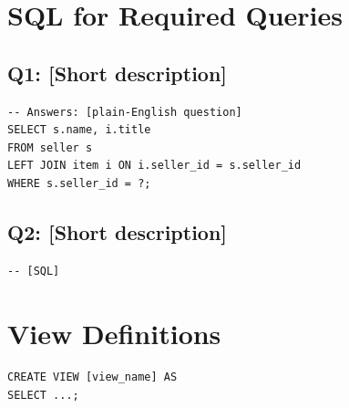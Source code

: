 \documentclass[11pt]{article}
\begin{document}
\clearpage
\appendix

\section{SQL for Required Queries}

\subsection*{Q1: [Short description]}
\begin{lstlisting}
-- Answers: [plain-English question]
SELECT s.name, i.title
FROM seller s
LEFT JOIN item i ON i.seller_id = s.seller_id
WHERE s.seller_id = ?;
\end{lstlisting}

\subsection*{Q2: [Short description]}
\begin{lstlisting}
-- [SQL]
\end{lstlisting}


\section{View Definitions}
\begin{lstlisting}
CREATE VIEW [view_name] AS
SELECT ...;
\end{lstlisting}
\end{document}
